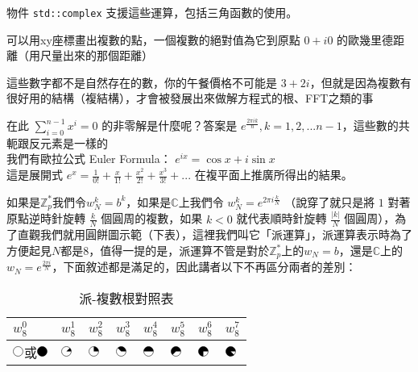 物件 \lstinline{std::complex} 支援這些運算，包括三角函數的使用。

可以用xy座標畫出複數的點，一個複數的絕對值為它到原點 $0+i0$ 的歐幾里德距離（用尺量出來的那個距離）

這些數字都不是自然存在的數，你的午餐價格不可能是 $3+2i$，但就是因為複數有很好用的結構（複結構），才會被發展出來做解方程式的根、FFT之類的事

在此 $\sum_{i=0}^{n-1}x^i=0$ 的非零解是什麼呢？答案是 $e^{\frac{2\pi i k}{n}}, k = 1,2,...n-1$，這些數的共軛跟反元素是一樣的\\
我們有歐拉公式 Euler Formula：
$e^{ix}=\cos x + i \sin x$\\
這是展開式 $e^x=\frac 1 {0!}+\frac x {1!}+\frac {x^2} {2!}+\frac {x^3} {3!}+...$  在複平面上推廣所得出的結果。

如果是$\mathbb Z_p^*$我們令$w^k_N=b^k$，如果是$\mathbb{C}$上我們令 $w^k_N=e^{2\pi i\frac{ k}{N}}$ （說穿了就只是將 $1$ 對著原點逆時針旋轉 $\frac k N$ 個圓周的複數，如果 $k<0$ 就代表順時針旋轉 $\frac {|k|} N$ 個圓周），為了直觀我們就用圓餅圖示範（下表），這裡我們叫它「派運算」，派運算表示時為了方便起見$N$都是8，值得一提的是，派運算不管是對於$\mathbb{Z}_p^*$上的$w_N=b$，還是$\mathbb{C}$上的$w_N=e^{\frac{ 2\pi i}{N}}$，下面敘述都是滿足的，因此講者以下不再區分兩者的差別：

\begin{table}[h]
	\begin{tabularx}{\textwidth}{X | X | X | X | X|X | X | X }
		$w^0_8$	& $w^1_8$	& $w^2_8$	&$w^3_8$  &$w^4_8$  &$w^5_8$  &$w^6_8$  &$w^7_8$ \\ \hline
		$\pie{0}$或$\pie{360}$	& $\pie{45}$	& $\pie{90}$	 &$\pie{135}$	 &$\pie{180}$	  &$\pie{225}$	  &$\pie{270}$	  &$\pie{315}$\\ %
	\end{tabularx}
	\label{tab:fft:dft:table}
	\caption{派-複數根對照表}
\end{table}


